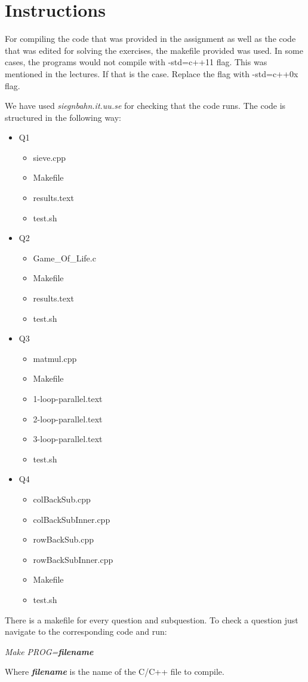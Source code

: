 \section{Instructions}

For compiling the code that was provided in the assignment as well as the 
code that was edited for solving the exercises, the makefile provided was used.
In some cases, the programs would not compile with -std=c++11 flag. This was mentioned
in the lectures. If that is the case. Replace the flag with -std=c++0x flag.

We have used \textit{siegnbahn.it.uu.se} for checking that the code runs.
The code is structured in the following way:

\begin{itemize}
    \item Q1
    \begin{itemize}
        \item sieve.cpp
        \item Makefile
        \item results.text
        \item test.sh
    \end{itemize}
    \item Q2
        \begin{itemize}
            \item Game\_Of\_Life.c
            \item Makefile
            \item results.text
            \item test.sh
        \end{itemize}
    \item Q3
        \begin{itemize}
            \item matmul.cpp
            \item Makefile
            \item 1-loop-parallel.text
            \item 2-loop-parallel.text
            \item 3-loop-parallel.text
            \item test.sh
        \end{itemize}
    \item Q4
        \begin{itemize}
            \item colBackSub.cpp
            \item colBackSubInner.cpp
            \item rowBackSub.cpp
            \item rowBackSubInner.cpp
            \item Makefile
            \item test.sh
        \end{itemize}
\end{itemize}

There is a makefile for every question and subquestion. To check a question
just navigate to the corresponding code and run:

\begin{center}
    \textit{Make PROG=\textbf{filename}}
\end{center}

Where \textit{\textbf{filename}} is the name of the C/C++ file to compile.